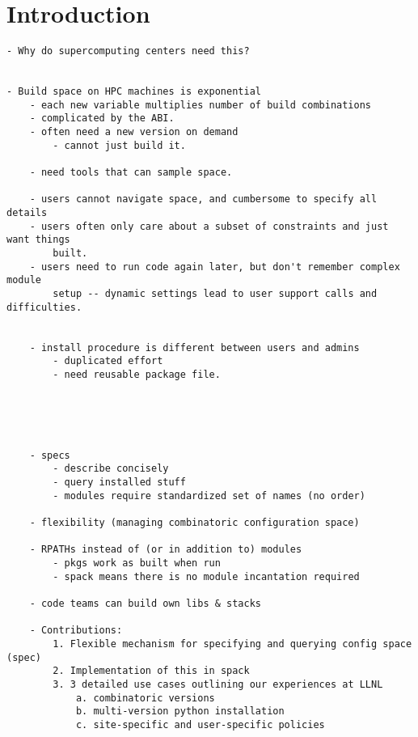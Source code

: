 
\section{Introduction}
\label{sec:intro}










\begin{verbatim}
- Why do supercomputing centers need this?


- Build space on HPC machines is exponential
	- each new variable multiplies number of build combinations
	- complicated by the ABI.
	- often need a new version on demand
		- cannot just build it.

	- need tools that can sample space.
		
	- users cannot navigate space, and cumbersome to specify all details
	- users often only care about a subset of constraints and just want things
		built.
	- users need to run code again later, but don't remember complex module
		setup -- dynamic settings lead to user support calls and difficulties.
	
	
	- install procedure is different between users and admins
		- duplicated effort
		- need reusable package file.

	
	
	

	- specs
		- describe concisely
		- query installed stuff
		- modules require standardized set of names (no order)

	- flexibility (managing combinatoric configuration space)

	- RPATHs instead of (or in addition to) modules
		- pkgs work as built when run
		- spack means there is no module incantation required

	- code teams can build own libs & stacks

	- Contributions:
		1. Flexible mechanism for specifying and querying config space (spec)
		2. Implementation of this in spack
		3. 3 detailed use cases outlining our experiences at LLNL
			a. combinatoric versions
			b. multi-version python installation
			c. site-specific and user-specific policies
\end{verbatim}

